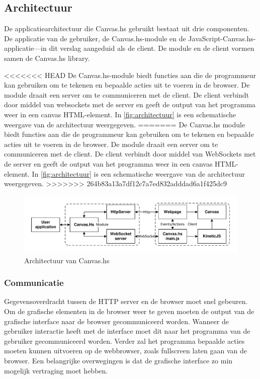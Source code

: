 \subsection{Architectuur}
\label{subsec:architectuur}

De applicatiearchitectuur die Canvas.hs gebruikt bestaat uit drie componenten. De applicatie van de gebruiker, de Canvas.hs-module en de JavaScript-Canvas.hs-applicatie—in dit verslag aangeduid als de client. De module en de client vormen samen de Canvas.hs library.

<<<<<<< HEAD
De Canvas.hs-module biedt functies aan die de programmeur kan gebruiken om te tekenen en bepaalde acties uit te voeren in de browser. De module draait een server om te communiceren met de client. De client verbindt door middel van websockets met de server en geeft de output van het programma weer in een canvas HTML-element. In \autoref{fig:architectuur} is een schematische weergave van de architectuur weergegeven.
=======
De Canvas.hs module biedt functies aan die de programmeur kan gebruiken om te tekenen en bepaalde acties uit te voeren in de browser. De module draait een server om te communiceren met de client. De client verbindt door middel van WebSockets met de server en geeft de output van het programma weer in een canvas HTML-element. In \autoref{fig:architectuur} is een schematische weergave van de architectuur weergegeven.
>>>>>>> 264b83a13a7df12c7a7ed832adddad6a1f425dc9

\begin{figure}
\begin{center}
\includegraphics[keepaspectratio,width=\textwidth]{./images/architecture.pdf}
\caption{Architectuur van Canvas.hs}
\label{fig:architectuur}
\end{center}
\end{figure}

\subsubsection{Communicatie}
Gegevensoverdracht tussen de HTTP server en de browser moet snel gebeuren. Om de grafische elementen in de browser weer te geven moeten de output van de grafische interface naar de browser gecommuniceerd worden. Wanneer de gebruiker interactie heeft met de interface moet dit naar het programma van de gebruiker gecommuniceerd worden. Verder zal het programma bepaalde acties moeten kunnen uitvoeren op de webbrowser, zoals fullscreen laten gaan van de browser. Een belangrijke overwegingen is dat de grafische interface zo min mogelijk vertraging moet hebben.


